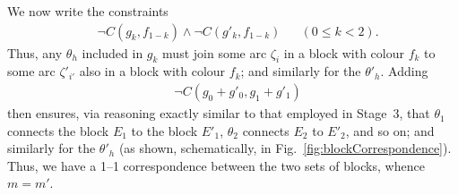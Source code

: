 \documentclass{article}
\begin{document}
We now write the constraints
\begin{align*}
& \neg C(g_k, f_{1-k}) \wedge  \neg C(g'_k, f_{1-k})  & & (0 \leq k < 2).
\end{align*}
Thus, any $\theta_h$ included in $g_k$ must join some arc $\zeta_i$ in
a block with colour $f_k$ to some arc $\zeta'_{i'}$ also in a block
with colour $f_k$; and similarly for the $\theta'_h$.
Adding
\begin{align*}
& \neg C(g_0 + g'_0, g_1 + g'_1)
\end{align*}
then ensures, via reasoning exactly similar to that employed in
Stage~3, that $\theta_1$ connects the block $E_1$ to the block $E'_1$,
$\theta_2$ connects $E_2$ to $E'_2$, and so on; and similarly for the
$\theta'_h$ (as shown, schematically, in
Fig.~\ref{fig:blockCorrespondence}).  Thus, we have a 1--1
correspondence between the two sets of blocks, whence $m = m'$.
\end{document}
